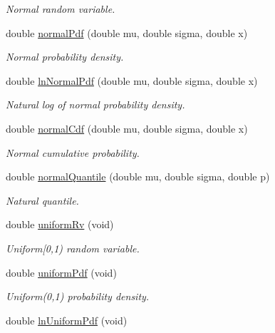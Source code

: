\begin{DoxyCompactItemize}
\begin{DoxyCompactList}\small\item\em Normal random variable. \end{DoxyCompactList}\item 
double \mbox{\hyperlink{class_mb_random_a15d74c49ce89d4743728fe81c901947f}{normal\+Pdf}} (double mu, double sigma, double x)
\begin{DoxyCompactList}\small\item\em Normal probability density. \end{DoxyCompactList}\item 
double \mbox{\hyperlink{class_mb_random_a63ee512328a66f5f3f15f45b7d66f476}{ln\+Normal\+Pdf}} (double mu, double sigma, double x)
\begin{DoxyCompactList}\small\item\em Natural log of normal probability density. \end{DoxyCompactList}\item 
double \mbox{\hyperlink{class_mb_random_a7093d47caddfb2225cbd409a5c00a206}{normal\+Cdf}} (double mu, double sigma, double x)
\begin{DoxyCompactList}\small\item\em Normal cumulative probability. \end{DoxyCompactList}\item 
double \mbox{\hyperlink{class_mb_random_a4fd385a54556283dd40e130ea1155035}{normal\+Quantile}} (double mu, double sigma, double p)
\begin{DoxyCompactList}\small\item\em Natural quantile. \end{DoxyCompactList}\item 
double \mbox{\hyperlink{class_mb_random_af7e99ee2ca8a02c2ae163e1c00f528bf}{uniform\+Rv}} (void)
\begin{DoxyCompactList}\small\item\em Uniform\mbox{[}0,1) random variable. \end{DoxyCompactList}\item 
double \mbox{\hyperlink{class_mb_random_a9988ff0258360c8f05ef907f8d9c0805}{uniform\+Pdf}} (void)
\begin{DoxyCompactList}\small\item\em Uniform(0,1) probability density. \end{DoxyCompactList}\item 
double \mbox{\hyperlink{class_mb_random_a586a679287cdba3195ee0620d6cb15f8}{ln\+Uniform\+Pdf}} (void)

\end{DoxyCompactItemize}
